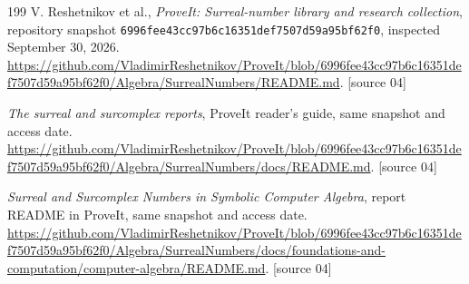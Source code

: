 \documentclass[11pt,a4paper]{article}
\numberwithin{equation}{section}
\theoremstyle{plain}
\newcommand{\srcnote}[1]{\textup{[#1]}}%
\newcommand{\smallurl}[1]{{\small\url{#1}}}
\newcommand{\repocommit}{6996fee43cc97b6c16351def7507d59a95bf62f0}
\newcounter{polybibc}
\newenvironment{polybiblist}[1]{\let\section\subsection\renewcommand{\refname}{#1}%
 \begin{thebibliography}{199}\setcounter{enumiv}{\value{polybibc}}}%
 {\setcounter{polybibc}{\value{enumiv}}\end{thebibliography}}
\begin{document}
\begin{polybiblist}{Part V (manuscripts 07 and 04)}
V. Reshetnikov et al.,
\emph{ProveIt: Surreal-number library and research collection},
repository snapshot \texttt{\repocommit}, inspected September 30, 2026.
\smallurl{https://github.com/VladimirReshetnikov/ProveIt/blob/6996fee43cc97b6c16351def7507d59a95bf62f0/Algebra/SurrealNumbers/README.md}.
\srcnote{source 04}

\emph{The surreal and surcomplex reports}, ProveIt reader's guide,
same snapshot and access date.
\smallurl{https://github.com/VladimirReshetnikov/ProveIt/blob/6996fee43cc97b6c16351def7507d59a95bf62f0/Algebra/SurrealNumbers/docs/README.md}.
\srcnote{source 04}

\emph{Surreal and Surcomplex Numbers in Symbolic Computer Algebra},
report README in ProveIt, same snapshot and access date.
\smallurl{https://github.com/VladimirReshetnikov/ProveIt/blob/6996fee43cc97b6c16351def7507d59a95bf62f0/Algebra/SurrealNumbers/docs/foundations-and-computation/computer-algebra/README.md}.
\srcnote{source 04}

\end{polybiblist}
\end{document}
